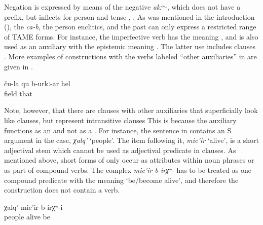 Negation is expressed by means of the negative  \textit{akːʷ-}, which does not have a  prefix, but inflects for person and tense , . As was mentioned in the introduction (), the  \textit{ca-b}, the person enclitics, and the past  can only express a restricted range of TAME forms. For instance, the imperfective verb  has the meaning , and is also used as an auxiliary with the epistemic meaning . The latter use includes  clauses . More examples of  constructions with the verbs labeled ``other auxiliaries'' in  are given in .

 \begin{exe}
 \ex	\label{That is probably their field.}
\gll ču-la	qu	b-urkː-ar	hel	\\
	field		that	\\
 \glt	{}
\end{exe}

Note, however, that there are clauses with other auxiliaries that superficially look like  clauses, but represent intransitive clauses This is because the auxiliary functions as an  and not as a . For instance, the sentence in  contains an S argument in the  case, \textit{χalq'} `people'. The item following it, \textit{mic'ir} `alive', is a short adjectival stem which cannot be used as adjectival predicate in  clauses. As mentioned above, short forms of  only occur as attributes within noun phrases or as part of compound verbs. The complex  \textit{mic'ir	b-irχʷ-} has to be treated as one compound predicate with the meaning `be\slash become alive', and therefore the construction does not contain a  verb.
 
 \begin{exe}
	\ex	\label{ex:peopleusedtobealive}
	\gll	χalq'	mic'ir	b-irχʷ-i\\
		people	alive	be\\
	\glt	{}
\end{exe}


